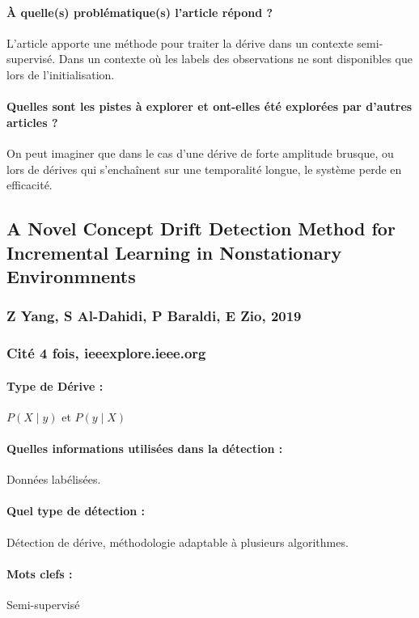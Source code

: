 \documentclass[11pt,a4paper]{report}
\begin{document}
\paragraph{À quelle(s) problématique(s) l'article répond ?} L'article apporte une méthode pour traiter la dérive dans un contexte semi-supervisé. Dans un contexte où les labels des observations ne sont disponibles que lors de l'initialisation.

\paragraph{Quelles sont les pistes à explorer et ont-elles  été explorées par d'autres articles ?} On peut imaginer que dans le cas d'une dérive de forte amplitude brusque, ou lors de dérives qui s'enchaînent sur une temporalité longue, le système perde en efficacité.








\subsection{A Novel Concept Drift Detection Method for Incremental Learning in Nonstationary Environmnents}
\subsubsection{Z Yang, S Al-Dahidi, P Baraldi, E Zio, 2019}

\subsubsection{Cité 4 fois, ieeexplore.ieee.org}

\paragraph{Type de Dérive :} $P(X\mid y)$ et $P(y \mid X)$
\paragraph{Quelles informations utilisées dans la détection :} Données labélisées.
\paragraph{Quel type de détection :} Détection de dérive, méthodologie adaptable à plusieurs algorithmes.
\paragraph{Mots clefs :} Semi-supervisé
\end{document}
